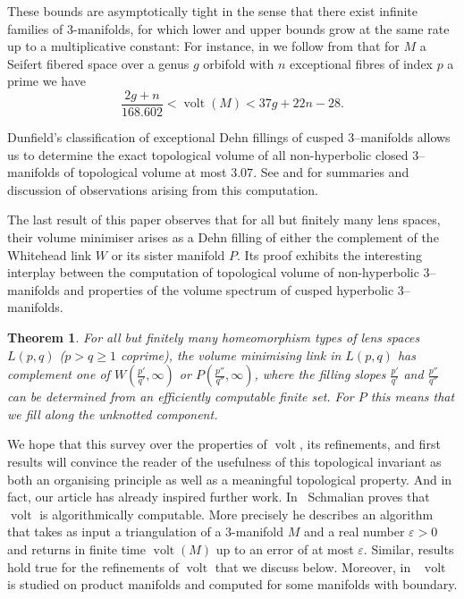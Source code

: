 \documentclass[a4paper]{gtart}
\newtheorem{theorem}[proposition]{Theorem}
\theoremstyle{definition}
\theoremstyle{remark}
\numberwithin{equation}{section}
\DeclareMathOperator{\volt}{volt}
\begin{document}
These bounds are asymptotically tight in the sense that there exist infinite families of $3$-manifolds, for which lower and upper bounds grow at the same rate up to a multiplicative constant: For instance, in  we follow from  that for $M$ a Seifert fibered space over a genus $g$ orbifold with $n$ exceptional fibres of index $p$ a prime we have
\[ \frac{2g + n}{168.602} < \volt(M ) < 37g + 22n - 28.\] 

Dunfield's classification of exceptional Dehn fillings of cusped $3$--manifolds \cite{Du20} allows us to determine the exact topological volume of all non-hyperbolic closed $3$--manifolds of topological volume at most $3.07$. See  and  for summaries and discussion of observations arising from this computation.

The last result of this paper observes that for all but finitely many lens spaces, their volume minimiser arises as a Dehn filling of either the complement of the Whitehead link $W$ or its sister manifold $P$. Its proof exhibits the interesting interplay between the computation of topological volume of non-hyperbolic 3--manifolds and properties of the volume spectrum of cusped hyperbolic 3--manifolds.

\begin{theorem}\label{prop:lens-space-limit}
For all but finitely many homeomorphism types of lens spaces $L(p,q)$ ($p>q\geq 1$ coprime), the volume minimising link in $L(p,q)$ has complement one of $W(\frac{p'}{q'}, \infty)$ or $P(\frac{p''}{q''}, \infty)$, where the filling slopes $\frac{p'}{q'}$ and $\frac{p''}{q''}$ can be determined from an efficiently computable finite set. For $P$ this means that we fill along the unknotted component.
\end{theorem}

We hope that this survey over the properties of $\volt$, its refinements, and first results will convince the reader of the usefulness of this topological invariant as both an organising principle as well as a meaningful topological property. And in fact, our article has already inspired further work. In~\cite{schmalian} Schmalian proves that $\volt$ is algorithmically computable. More precisely he describes an algorithm that takes as input a triangulation of a $3$-manifold $M$ and a real number $\varepsilon>0$ and returns in finite time $\volt(M)$ up to an error of at most $\varepsilon$. Similar, results hold true for the refinements of $\volt$ that we discuss below. Moreover, in~\cite{volt2} $\volt$ is studied on product manifolds and computed for some manifolds with boundary. 
\end{document}
